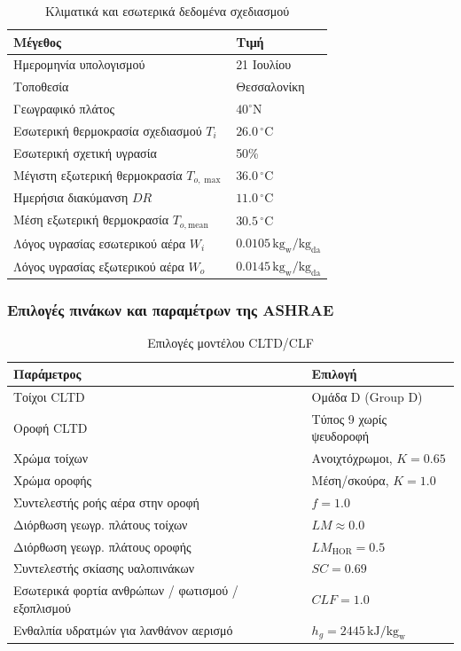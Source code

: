 \documentclass[12pt,a4paper]{article}
\begin{document}
\begin{table}[H]
\centering
\caption{Κλιματικά και εσωτερικά δεδομένα σχεδιασμού}
\begin{tabularx}{\textwidth}{L C{3.8cm}}
\toprule
\textbf{Μέγεθος} & \textbf{Τιμή} \\
\midrule
Ημερομηνία υπολογισμού & 21 Ιουλίου \\
Τοποθεσία & Θεσσαλονίκη \\
Γεωγραφικό πλάτος & \(40^\circ \mathrm{N}\) \\
Εσωτερική θερμοκρασία σχεδιασμού \(T_i\) & \(26.0\,^\circ\mathrm{C}\) \\
Εσωτερική σχετική υγρασία & 50\% \\
Μέγιστη εξωτερική θερμοκρασία \(T_{o,\max}\) & \(36.0\,^\circ\mathrm{C}\) \\
Ημερήσια διακύμανση \(DR\) & \(11.0\,^\circ\mathrm{C}\) \\
Μέση εξωτερική θερμοκρασία \(T_{o,\mathrm{mean}}\) & \(30.5\,^\circ\mathrm{C}\) \\
Λόγος υγρασίας εσωτερικού αέρα \(W_i\) & \(0.0105\,\mathrm{kg_w/kg_{da}}\) \\
Λόγος υγρασίας εξωτερικού αέρα \(W_o\) & \(0.0145\,\mathrm{kg_w/kg_{da}}\) \\
\bottomrule
\end{tabularx}
\end{table}

\subsubsection{Επιλογές πινάκων και παραμέτρων της ASHRAE}

\begin{table}[H]
\centering
\caption{Επιλογές μοντέλου CLTD/CLF}
\begin{tabularx}{\textwidth}{L C{4.0cm}}
\toprule
\textbf{Παράμετρος} & \textbf{Επιλογή} \\
\midrule
Τοίχοι CLTD & Ομάδα D (\textenglish{Group D}) \\
Οροφή CLTD & Τύπος 9 χωρίς ψευδοροφή \\
Χρώμα τοίχων & Ανοιχτόχρωμοι, \(K=0.65\) \\
Χρώμα οροφής & Μέση/σκούρα, \(K=1.0\) \\
Συντελεστής ροής αέρα στην οροφή & \(f = 1.0\) \\
Διόρθωση γεωγρ. πλάτους τοίχων & \(LM \approx 0.0\) \\
Διόρθωση γεωγρ. πλάτους οροφής & \(LM_{\mathrm{HOR}} = 0.5\) \\
Συντελεστής σκίασης υαλοπινάκων & \(SC = 0.69\) \\
Εσωτερικά φορτία ανθρώπων / φωτισμού / εξοπλισμού & \(CLF = 1.0\) \\
Ενθαλπία υδρατμών για λανθάνον αερισμό & \(h_g = 2445\,\mathrm{kJ/kg_w}\) \\
\bottomrule
\end{tabularx}
\end{table}
\end{document}
